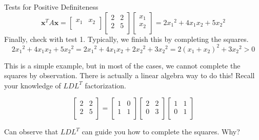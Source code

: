 \documentclass{beamer}
\begin{document}
\begin{frame}{Tests for Positive Definiteness}
    \begin{equation*}
    \mathbf{x}^TA\mathbf{x}=\left[ \begin{matrix}
        x_1&		x_2\\
    \end{matrix} \right] \left[ \begin{matrix}
        2&		2\\
        2&		5\\
    \end{matrix} \right] \left[ \begin{array}{c}
        x_1\\
        x_2\\
    \end{array} \right] =2{x_1}^2+4x_1x_2+5{x_2}^2
\end{equation*}
Finally, check with test 1. Typically, we finish this by completing the squares.
\begin{equation*}
    2{x_1}^2+4x_1x_2+5{x_2}^2=2{x_1}^2+4x_1x_2+2{x_2}^2+3{x_2}^2=2\left( x_1+x_2 \right) ^2+3{x_2}^2>0
\end{equation*}

This is a simple example, but in most of the cases, we cannot complete the squares by observation. There is actually a linear algebra way to do this! Recall your knowledge of $LDL^T$ factorization.

\begin{equation*}
    \left[ \begin{matrix}
        2&		2\\
        2&		5\\
    \end{matrix} \right] =\left[ \begin{matrix}
        1&		0\\
        1&		1\\
    \end{matrix} \right] \left[ \begin{matrix}
        2&		2\\
        0&		3\\
    \end{matrix} \right] \left[ \begin{matrix}
        1&		1\\
        0&		1\\
    \end{matrix} \right]
\end{equation*}

Can observe that $LDL^T$ can guide you how to complete the squares. Why?
\end{frame}
\end{document}

